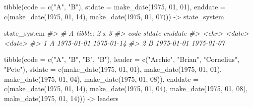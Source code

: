 \documentclass[
  11pt,
]{article}
\newenvironment{Shaded}{\begin{snugshade}}{\end{snugshade}}
\newcommand{\AttributeTok}[1]{\textcolor[rgb]{0.77,0.63,0.00}{#1}}
\newcommand{\CommentTok}[1]{\textcolor[rgb]{0.56,0.35,0.01}{\textit{#1}}}
\newcommand{\DecValTok}[1]{\textcolor[rgb]{0.00,0.00,0.81}{#1}}
\newcommand{\FunctionTok}[1]{\textcolor[rgb]{0.00,0.00,0.00}{#1}}
\newcommand{\NormalTok}[1]{#1}
\newcommand{\OtherTok}[1]{\textcolor[rgb]{0.56,0.35,0.01}{#1}}
\newcommand{\StringTok}[1]{\textcolor[rgb]{0.31,0.60,0.02}{#1}}
\begin{document}
\begin{Shaded}
\begin{Highlighting}[]
\FunctionTok{tibble}\NormalTok{(}\AttributeTok{code =} \FunctionTok{c}\NormalTok{(}\StringTok{"A"}\NormalTok{, }\StringTok{"B"}\NormalTok{),}
       \AttributeTok{stdate =} \FunctionTok{make\_date}\NormalTok{(}\DecValTok{1975}\NormalTok{, }\DecValTok{01}\NormalTok{, }\DecValTok{01}\NormalTok{),}
       \AttributeTok{enddate =} \FunctionTok{c}\NormalTok{(}\FunctionTok{make\_date}\NormalTok{(}\DecValTok{1975}\NormalTok{, }\DecValTok{01}\NormalTok{, }\DecValTok{14}\NormalTok{), }
                   \FunctionTok{make\_date}\NormalTok{(}\DecValTok{1975}\NormalTok{, }\DecValTok{01}\NormalTok{, }\DecValTok{07}\NormalTok{))) }\OtherTok{{-}\textgreater{}}\NormalTok{ state\_system}

\NormalTok{state\_system}
\CommentTok{\#\textgreater{} \# A tibble: 2 x 3}
\CommentTok{\#\textgreater{}   code  stdate     enddate   }
\CommentTok{\#\textgreater{}   \textless{}chr\textgreater{} \textless{}date\textgreater{}     \textless{}date\textgreater{}    }
\CommentTok{\#\textgreater{} 1 A     1975{-}01{-}01 1975{-}01{-}14}
\CommentTok{\#\textgreater{} 2 B     1975{-}01{-}01 1975{-}01{-}07}

\FunctionTok{tibble}\NormalTok{(}\AttributeTok{code =} \FunctionTok{c}\NormalTok{(}\StringTok{"A"}\NormalTok{, }\StringTok{"B"}\NormalTok{, }\StringTok{"B"}\NormalTok{, }\StringTok{"B"}\NormalTok{),}
       \AttributeTok{leader =} \FunctionTok{c}\NormalTok{(}\StringTok{"Archie"}\NormalTok{, }\StringTok{"Brian"}\NormalTok{, }\StringTok{"Cornelius"}\NormalTok{, }\StringTok{"Pete"}\NormalTok{),}
       \AttributeTok{stdate =} \FunctionTok{c}\NormalTok{(}\FunctionTok{make\_date}\NormalTok{(}\DecValTok{1975}\NormalTok{, }\DecValTok{01}\NormalTok{, }\DecValTok{01}\NormalTok{), }\FunctionTok{make\_date}\NormalTok{(}\DecValTok{1975}\NormalTok{, }\DecValTok{01}\NormalTok{, }\DecValTok{01}\NormalTok{), }
                  \FunctionTok{make\_date}\NormalTok{(}\DecValTok{1975}\NormalTok{, }\DecValTok{01}\NormalTok{, }\DecValTok{04}\NormalTok{), }\FunctionTok{make\_date}\NormalTok{(}\DecValTok{1975}\NormalTok{, }\DecValTok{01}\NormalTok{, }\DecValTok{08}\NormalTok{)),}
       \AttributeTok{enddate =} \FunctionTok{c}\NormalTok{(}\FunctionTok{make\_date}\NormalTok{(}\DecValTok{1975}\NormalTok{, }\DecValTok{01}\NormalTok{, }\DecValTok{14}\NormalTok{), }\FunctionTok{make\_date}\NormalTok{(}\DecValTok{1975}\NormalTok{, }\DecValTok{01}\NormalTok{, }\DecValTok{04}\NormalTok{), }
                   \FunctionTok{make\_date}\NormalTok{(}\DecValTok{1975}\NormalTok{, }\DecValTok{01}\NormalTok{, }\DecValTok{08}\NormalTok{), }\FunctionTok{make\_date}\NormalTok{(}\DecValTok{1975}\NormalTok{, }\DecValTok{01}\NormalTok{, }\DecValTok{14}\NormalTok{))) }\OtherTok{{-}\textgreater{}}\NormalTok{ leaders}


\end{Highlighting}
\end{Shaded}
\end{document}
